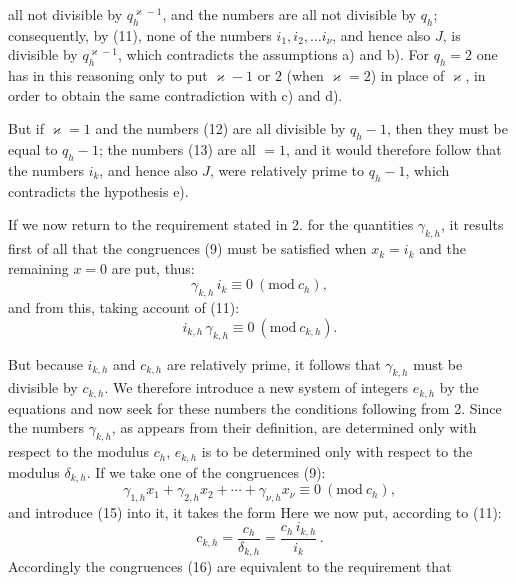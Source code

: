 all not divisible by $q_h^{\varkappa-1}$, and the numbers
are all not divisible by $q_h$; consequently, by (11), none of the
numbers $i_1, i_2, \dots i_\nu$, and hence also $J$, is divisible by $q_h^{\varkappa-1}$,
which contradicts the assumptions a) and b). For $q_h = 2$ one has
in this reasoning only to put $\varkappa - 1$ or $2$ (when $\varkappa = 2$) in place of $\varkappa$,
in order to obtain the same contradiction with c) and d).

    But if $\varkappa = 1$ and the numbers (12) are all divisible by $q_h - 1$,
then they must be equal to $q_h - 1$; the numbers (13) are
all $= 1$, and it would therefore follow that the numbers $i_k$, and
hence also $J$, were relatively prime to $q_h - 1$, which contradicts the hypothesis e).

    If we now return to the requirement stated in 2. for
the quantities $\gamma_{k,h}$, it results first of all that
the congruences (9) must be satisfied when $x_k = i_k$ and the
remaining $x = 0$ are put, thus:
\[
\gamma_{k,h}\, i_k \equiv 0\ (\mathrm{mod}\ c_h),
\]
and from this, taking account of (11):
\[
i_{k,h}\, \gamma_{k,h} \equiv 0\ (\mathrm{mod}\ c_{k,h}).
\]

    But because $i_{k,h}$ and $c_{k,h}$ are relatively prime, it follows that $\gamma_{k,h}$
must be divisible by $c_{k,h}$. We therefore introduce a new system
of integers $e_{k,h}$ by the equations
and now seek for these numbers the conditions following from 2. Since the numbers $\gamma_{k,h}$, as appears from their definition, are determined only with respect to the modulus $c_h$, $e_{k,h}$ is to be determined only with respect to
the modulus $\delta_{k,h}$. If we take one of the congruences (9):
\[
\gamma_{1,h}x_1 + \gamma_{2,h}x_2 + \cdots + \gamma_{\nu,h}x_\nu \equiv 0\ (\mathrm{mod}\ c_h),
\]
and introduce (15) into it, it takes the form
Here we now put, according to (11):
\[
c_{k,h} = \frac{c_h}{\delta_{k,h}} = \frac{c_h\, i_{k,h}}{i_k}\,.
\]
Accordingly the congruences (16) are equivalent to
the requirement that
